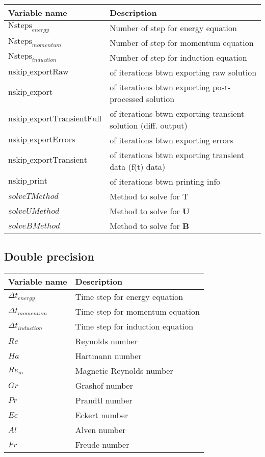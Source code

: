 \documentclass[11pt]{article}
\begin{document}
\begin{tabular}{ | l | l | }
\hline  \textbf{Variable name}  & \textbf{Description} \\
\hline $\text{Nsteps}_{energy}$     & Number of step for energy equation       \\
\hline $\text{Nsteps}_{momentum}$   & Number of step for momentum equation     \\
\hline $\text{Nsteps}_{induction}$  & Number of step for induction equation    \\
\hline $\text{nskip\_exportRaw}$           & of iterations btwn exporting raw solution  \\
\hline $\text{nskip\_export}$              & of iterations btwn exporting post-processed solution  \\
\hline $\text{nskip\_exportTransientFull}$ & of iterations btwn exporting transient solution (diff. output)  \\
\hline $\text{nskip\_exportErrors}$        & of iterations btwn exporting errors  \\
\hline $\text{nskip\_exportTransient}$     & of iterations btwn exporting transient data (f(t) data)  \\
\hline $\text{nskip\_print}$               & of iterations btwn printing info  \\
\hline $solveTMethod$                      & Method to solve for T \\
\hline $solveUMethod$                      & Method to solve for $\mathbf{U}$ \\
\hline $solveBMethod$                      & Method to solve for $\mathbf{B}$ \\
\hline
\end{tabular}

\subsection{Double precision}
\begin{tabular}{ | l | l | }
\hline  \textbf{Variable name}  & \textbf{Description} \\
\hline $\Delta t_{energy}$     & Time step for energy equation       \\
\hline $\Delta t_{momentum}$   & Time step for momentum equation     \\
\hline $\Delta t_{induction}$  & Time step for induction equation    \\
\hline $Re$   & Reynolds number          \\
\hline $Ha$   & Hartmann number          \\
\hline $Re_m$ & Magnetic Reynolds number \\
\hline $Gr$   & Grashof number           \\
\hline $Pr$   & Prandtl number           \\
\hline $Ec$   & Eckert number            \\
\hline $Al$   & Alven number             \\
\hline $Fr$   & Freude number            \\
\hline
\end{tabular}
\end{document}
